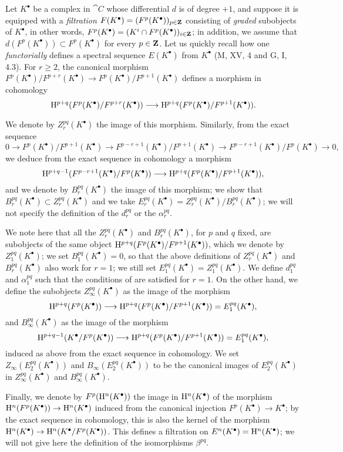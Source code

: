 \begin{env}[11.2.2]
\label{0.11.2.2}
Let $K^\bullet$ be a complex in $\cat{C}$ whose differential $d$ is of degree $+1$, and suppose it is equipped with a \emph{filtration $F(K^\bullet)=(F^p(K^\bullet))_{p\in\mathbf{Z}}$} consisting of \emph{graded} subobjects
of $K^\bullet$, in other words, $F^p(K^\bullet)=(K^i\cap F^p(K^\bullet))_{i\in\mathbf{Z}}$; in addition, we assume that $d(F^p(K^\bullet))\subset F^p(K^\bullet)$ for every $p\in\mathbf{Z}$.
Let us quickly recall how one \emph{functorially} defines a spectral sequence $E(K^\bullet)$ from $K^\bullet$ (M, XV, 4 and G, I, 4.3).
For $r\geq 2$, the canonical morphism $F^p(K^\bullet)/F^{p+r}(K^\bullet)\to F^p(K^\bullet)/F^{p+1}(K^\bullet)$ defines a morphism in cohomology
\[
  \HH^{p+q}(F^p(K^\bullet)/F^{p+r}(K^\bullet))\to\HH^{p+q}(F^p(K^\bullet)/F^{p+1}(K^\bullet)).
\]

We denote by $Z_r^{pq}(K^\bullet)$ the image of this morphism.
Similarly, from the exact sequence
\[
  0\to F^p(K^\bullet)/F^{p+1}(K^\bullet)\to F^{p-r+1}(K^\bullet)/F^{p+1}(K^\bullet)\to F^{p-r+1}(K^\bullet)/F^p(K^\bullet)\to 0,
\]
we deduce from the exact sequence in cohomology a morphism
\[
  \HH^{p+q-1}(F^{p-r+1}(K^\bullet)/F^p(K^\bullet))\to\HH^{p+q}(F^p(K^\bullet)/F^{p+1}(K^\bullet)),
\]
and we denote by $B_r^{pq}(K^\bullet)$ the image of this morphism; we show that $B_r^{pq}(K^\bullet)\subset Z_r^{pq}(K^\bullet)$ and we take $E_r^{pq}(K^\bullet)=Z_r^{pq}(K^\bullet)/B_r^{pq}(K^\bullet)$; we will not specify the definition of the $d_r^{pq}$ or the $\alpha_r^{pq}$.

We note here that all the $Z_r^{pq}(K^\bullet)$ and $B_r^{pq}(K^\bullet)$, for $p$ and $q$ fixed, are subobjects of the same object $\mathrm{H}^{p+q}(F^p(K^\bullet)/F^{p+1}(K^\bullet))$, which we denote by $Z_1^{pq}(K^\bullet)$; we set $B_1^{pq}(K^\bullet)=0$, so that the above definitions of $Z_r^{pq}(K^\bullet)$ and $B_r^{pq}(K^\bullet)$ also work for $r=1$; we still set $E_1^{pq}(K^\bullet)=Z_1^{pq}(K^\bullet)$.
We define $d_1^{pq}$ and $\alpha_1^{pq}$ such that the conditions of  are satisfied for $r=1$.
On the other hand, we define the subobjects $Z_\infty^{pq}(K^\bullet)$ as the image of the morphism
\[
  \HH^{p+q}(F^p(K^\bullet))\to\HH^{p+q}(F^p(K^\bullet)/F^{p+1}(K^\bullet))=E_1^{pq}(K^\bullet),
\]
and $B_\infty^{pq}(K^\bullet)$ as the image of the morphism
\[
  \HH^{p+q-1}(K^\bullet/F^p(K^\bullet))\to\HH^{p+q}(F^p(K^\bullet)/F^{p+1}(K^\bullet))=E_1^{pq}(K^\bullet),
\]
induced as above from the exact sequence in cohomology.
We set $Z_\infty(E_2^{pq}(K^\bullet))$ and $B_\infty(E_2^{pq}(K^\bullet))$ to be the canonical images of $E_2^{pq}(K^\bullet)$ in $Z_\infty^{pq}(K^\bullet)$ and $B_\infty^{pq}(K^\bullet)$.

Finally, we denote by $F^p(\mathrm{H}^n(K^\bullet))$ the image in $\mathrm{H}^n(K^\bullet)$ of the morphism $\HH^n(F^p(K^\bullet))\to\HH^n(K^\bullet)$ induced from the canonical injection $F^p(K^\bullet)\to K^\bullet$; by the exact sequence in cohomology, this is also the kernel of the morphism $\HH^n(K^\bullet)\to\HH^n(K^\bullet/F^p(K^\bullet))$.
This defines a filtration on $E^n(K^\bullet)=\mathrm{H}^n(K^\bullet)$; we will not give here the definition of the isomorphisms $\beta^{pq}$.
\end{env}

